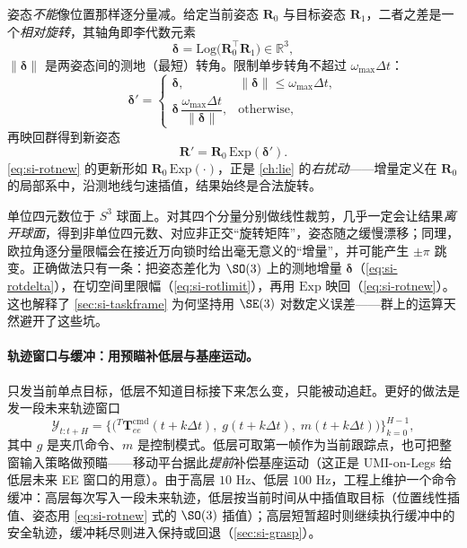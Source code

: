 \begin{derivation}
姿态\emph{不能}像位置那样逐分量减。给定当前姿态 $\mathbf R_0$ 与目标姿态 $\mathbf R_1$，二者之差是一个\emph{相对旋转}，其轴角即李代数元素
\begin{equation}
  \boldsymbol\delta=\mathrm{Log}\big(\mathbf R_0^\top\mathbf R_1\big)\in\mathbb R^3,
  \label{eq:si-rotdelta}
\end{equation}
$\|\boldsymbol\delta\|$ 是两姿态间的测地（最短）转角。限制单步转角不超过 $\omega_{\max}\Delta t$：
\begin{equation}
  \boldsymbol\delta'=
  \begin{cases}
    \boldsymbol\delta, & \|\boldsymbol\delta\|\le\omega_{\max}\Delta t,\\[2pt]
    \boldsymbol\delta\,\dfrac{\omega_{\max}\Delta t}{\|\boldsymbol\delta\|}, & \text{otherwise},
  \end{cases}
  \label{eq:si-rotlimit}
\end{equation}
再映回群得到新姿态
\begin{equation}
  \mathbf R'=\mathbf R_0\,\mathrm{Exp}(\boldsymbol\delta').
  \label{eq:si-rotnew}
\end{equation}
\cref{eq:si-rotnew} 的更新形如 $\mathbf R_0\,\mathrm{Exp}(\cdot)$，正是 \cref{ch:lie} 的\emph{右扰动}——增量定义在 $\mathbf R_0$ 的局部系中，沿测地线匀速插值，结果始终是合法旋转。
\end{derivation}

\begin{pitfall}
单位四元数位于 $S^3$ 球面上。对其四个分量分别做线性裁剪，几乎一定会让结果\emph{离开球面}，得到非单位四元数、对应非正交“旋转矩阵”，姿态随之缓慢漂移；同理，欧拉角逐分量限幅会在接近万向锁时给出毫无意义的“增量”，并可能产生 $\pm\pi$ 跳变。正确做法只有一条：把姿态差化为 $\SO(3)$ 上的测地增量 $\boldsymbol\delta$（\cref{eq:si-rotdelta}），在切空间里限幅（\cref{eq:si-rotlimit}），再用 $\mathrm{Exp}$ 映回（\cref{eq:si-rotnew}）。这也解释了 \cref{sec:si-taskframe} 为何坚持用 $\SE(3)$ 对数定义误差——群上的运算天然避开了这些坑。
\end{pitfall}

\paragraph{轨迹窗口与缓冲：用预瞄补低层与基座运动。}
只发当前单点目标，低层不知道目标接下来怎么变，只能被动追赶。更好的做法是发一段未来轨迹窗口
\begin{equation}
  \mathcal Y_{t:t+H}=\Big\{\big({}^{T}\mathbf{T}_{ee}^{\mathrm{cmd}}(t+k\Delta t),\;g(t+k\Delta t),\;m(t+k\Delta t)\big)\Big\}_{k=0}^{H-1},
  \label{eq:si-window}
\end{equation}
其中 $g$ 是夹爪命令、$m$ 是控制模式。低层可取第一帧作为当前跟踪点，也可把整窗输入策略做预瞄——移动平台据此\emph{提前}补偿基座运动（这正是 UMI-on-Legs 给低层未来 EE 窗口的用意）。由于高层 $10$ Hz、低层 $100$ Hz，工程上维护一个命令缓冲：高层每次写入一段未来轨迹，低层按当前时间从中插值取目标（位置线性插值、姿态用 \cref{eq:si-rotnew} 式的 $\SO(3)$ 插值）；高层短暂超时则继续执行缓冲中的安全轨迹，缓冲耗尽则进入保持或回退（\cref{sec:si-grasp}）。

